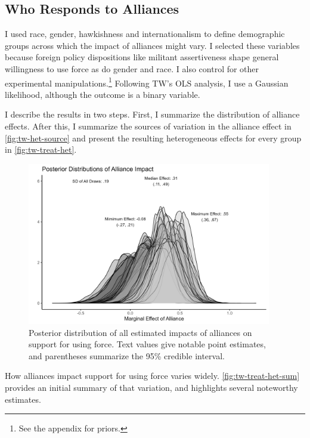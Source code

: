 \documentclass[12pt]{article}
\begin{document}
\subsection{Who Responds to Alliances}

I used race, gender, hawkishness and internationalism to define demographic groups across which the impact of alliances might vary. 
I selected these variables because foreign policy dispositions like militant assertiveness shape general willingness to use force \citep{Kertzeretal2014} as do gender \citep{Barnhartetal2020} and race. 
I also control for other experimental manipulations.\footnote{See the appendix for priors.} 
Following TW's OLS analysis, I use a Gaussian likelihood, although the outcome is a binary variable. 


I describe the results in two steps. 
First, I summarize the distribution of alliance effects. 
After this, I summarize the sources of variation in the alliance effect in \autoref{fig:tw-het-source} and present the resulting heterogeneous effects for every group in \autoref{fig:tw-treat-het}.

\begin{figure}[htpb]
	\centering
		\includegraphics[width=0.95\textwidth]{../figures/tw-treat-het-sum.png}
	\caption{Posterior distribution of all estimated impacts of alliances on support for using force. Text values give notable point estimates, and parentheses summarize the 95\% credible interval.}
	\label{fig:tw-treat-het-sum}
\end{figure}


How alliances impact support for using force varies widely. 
\autoref{fig:tw-treat-het-sum} provides an initial summary of that variation, and highlights several noteworthy estimates. 
\end{document}

